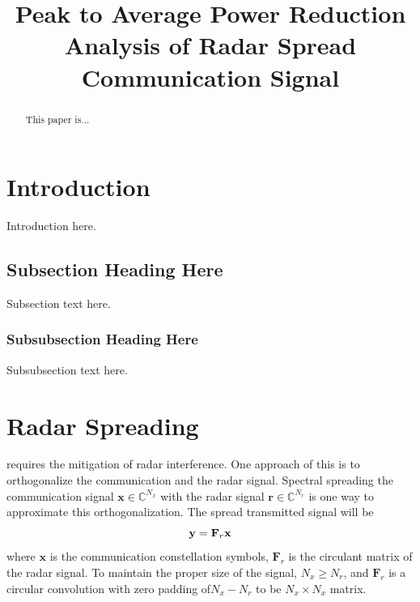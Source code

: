 \documentclass[conference]{IEEEtran}
\begin{document}
\title{Peak to Average Power Reduction Analysis of Radar Spread Communication Signal }

\author{
}
\maketitle

\begin{abstract}
This paper is...
\end{abstract}

\section{Introduction}
Introduction here.

\subsection{Subsection Heading Here}
Subsection text here.


\subsubsection{Subsubsection Heading Here}
Subsubsection text here.


\section{Radar Spreading}
\SSPARC requires the mitigation of radar interference. One approach of this is to orthogonalize the communication and the radar signal.  Spectral spreading the communication signal ${\mathbf{x}\in \mathbb{C}^{N_x}}$ with the radar signal $\mathbf{r}\in \mathbb{C}^{N_r}$ is one way to approximate this orthogonalization.  The spread transmitted signal will be
\begin{equation}
\mathbf{y}=\mathbf{F}_r \mathbf{x}\\
\label{eq1}
\end{equation}  
where $\mathbf{x}$ is the communication constellation symbols, $\mathbf{F}_r$ is the circulant matrix of the radar signal.  To maintain the proper size of the signal, $N_x\geq N_r$, and $\mathbf{F}_r$ is a circular convolution with zero padding of$N_x-N_r$ to be $N_x\times N_x$ matrix.
\end{document}
